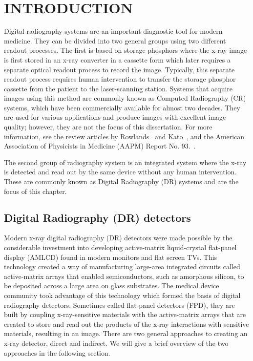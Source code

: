 \chapter{INTRODUCTION}
\label{chap:intro}
Digital radiography systems are an important diagnostic tool for modern medicine.  They can be divided into two general groups using two different readout processes.  The first is based on storage phosphors where the x-ray image is first stored in an x-ray converter in a cassette form which later requires a separate optical readout process to record the image.  Typically, this separate readout process requires human intervention to transfer the storage phosphor cassette from the patient to the laser-scanning station.  Systems that acquire images using this method are commonly known as Computed Radiography (CR) systems, which have been commercially available for almost two decades.  They are used for various applications and produce images with excellent image quality; however, they are not the focus of this dissertation.  For more information, see the review articles by Rowlands~\citep{Rowlands2002} and Kato~\citep{kato1994}, and the American Association of Physicists in Medicine (AAPM) Report No. 93.~\citep{AAPM93}.  

The second group of radiography system is an integrated system where the x-ray is detected and read out by the same device without any human intervention.  These are commonly known as Digital Radiography (DR) systems and are the focus of this chapter.

\section{Digital Radiography (DR) detectors}
Modern x-ray digital radiography (DR) detectors were made possible by the considerable investment into developing active-matrix liquid-crystal flat-panel display (AMLCD) found in modern monitors and flat screen TVs.  This technology created a way of manufacturing large-area integrated circuits called active-matrix arrays that enabled semiconductors, such as amorphous silicon, to be deposited across a large area on glass substrates.  The medical device community took advantage of this technology which formed the basis of digital radiography detectors.  Sometimes called flat-panel detectors (FPD), they are built by coupling x-ray-sensitive materials with the active-matrix arrays that are created to store and read out the products of the x-ray interactions with sensitive materials, resulting in an image.  There are two general approaches to creating an x-ray detector, direct and indirect.  We will give a brief overview of the two approaches in the following section.

